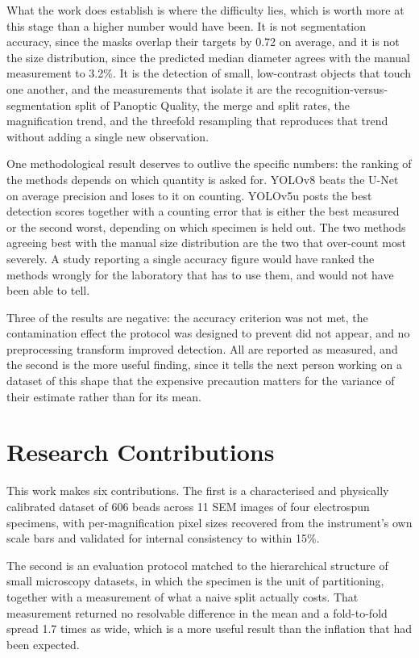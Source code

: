What the work does establish is where the difficulty lies, which is worth more at
this stage than a higher number would have been. It is not segmentation accuracy,
since the masks overlap their targets by 0.72 on average, and it is not the size
distribution, since the predicted median diameter agrees with the manual
measurement to 3.2\%. It is the detection of small, low-contrast objects that
touch one another, and the measurements that isolate it are the
recognition-versus-segmentation split of Panoptic Quality, the merge and split
rates, the magnification trend, and the threefold resampling that reproduces that
trend without adding a single new observation.

One methodological result deserves to outlive the specific numbers: the ranking of
the methods depends on which quantity is asked for. YOLOv8 beats the U-Net on
average precision and loses to it on counting. YOLOv5u posts the best detection
scores together with a counting error that is either the best measured or the
second worst, depending on which specimen is held out. The two methods agreeing
best with the manual size distribution are the two that over-count most severely.
A study reporting a single accuracy figure would have ranked the methods wrongly
for the laboratory that has to use them, and would not have been able to tell.

Three of the results are negative: the accuracy criterion was not met, the
contamination effect the protocol was designed to prevent did not appear, and no
preprocessing transform improved detection. All are reported as measured, and the
second is the more useful finding, since it tells the next person working on a
dataset of this shape that the expensive precaution matters for the variance of
their estimate rather than for its mean.

\section{Research Contributions}

This work makes six contributions. The first is a characterised and physically
calibrated dataset of 606 beads across 11 SEM images of four electrospun
specimens, with per-magnification pixel sizes recovered from the instrument's own
scale bars and validated for internal consistency to within 15\%.

The second is an evaluation protocol matched to the hierarchical structure of
small microscopy datasets, in which the specimen is the unit of partitioning,
together with a measurement of what a naive split actually costs. That measurement
returned no resolvable difference in the mean and a fold-to-fold spread 1.7 times
as wide, which is a more useful result than the inflation that had been expected.

